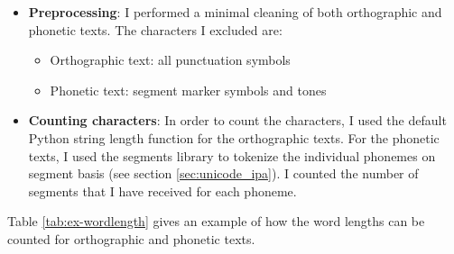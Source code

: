 \begin{description}[style=unboxed]
\begin{itemize}
    \item \textbf{Preprocessing}: I performed a minimal cleaning of both orthographic and phonetic texts. The characters I excluded are:
    \begin{itemize}
        \item Orthographic text: all punctuation symbols
        \item Phonetic text: segment marker symbols and tones
    \end{itemize}
    \item \textbf{Counting characters}: In order to count the characters, I used the default Python string length function for the orthographic texts. For the phonetic texts, I used the segments library to tokenize the individual phonemes on segment basis (see section \ref{sec:unicode_ipa}).  I counted the number of segments that I have received for each phoneme. 
\end{itemize}
Table \ref{tab:ex-wordlength} gives an example of how the word lengths can be counted for orthographic and phonetic texts.


\end{description}
